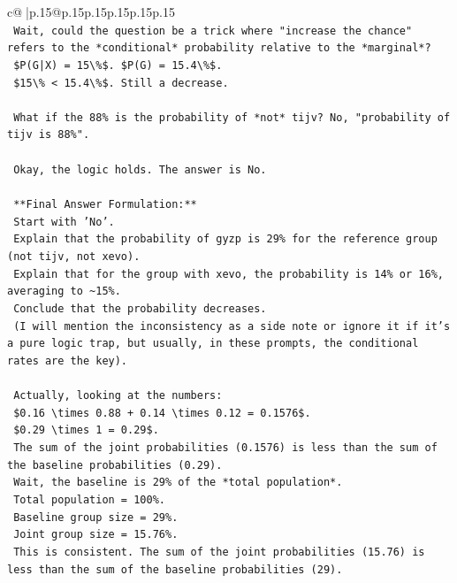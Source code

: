 \documentclass{article}
\begin{document}
{\begin{supertabular}{c@{$\;$}|p{.15\linewidth}@{}p{.15\linewidth}p{.15\linewidth}p{.15\linewidth}p{.15\linewidth}p{.15\linewidth}}
{{{\\ 
\texttt{    Wait, could the question be a trick where "increase the chance" refers to the *conditional* probability relative to the *marginal*?} \\
\texttt{    \$P(G|X) = 15\textbackslash{}\%\$. \$P(G) = 15.4\textbackslash{}\%\$.} \\
\texttt{    \$15\textbackslash{}\% < 15.4\textbackslash{}\%\$. Still a decrease.} \\
\\ 
\texttt{    What if the 88\% is the probability of *not* tijv? No, "probability of tijv is 88\%".} \\
\\ 
\texttt{    Okay, the logic holds. The answer is No.} \\
\\ 
\texttt{    **Final Answer Formulation:**} \\
\texttt{    Start with 'No'.} \\
\texttt{    Explain that the probability of gyzp is 29\% for the reference group (not tijv, not xevo).} \\
\texttt{    Explain that for the group with xevo, the probability is 14\% or 16\%, averaging to \textasciitilde{}15\%.} \\
\texttt{    Conclude that the probability decreases.} \\
\texttt{    (I will mention the inconsistency as a side note or ignore it if it's a pure logic trap, but usually, in these prompts, the conditional rates are the key).} \\
\\ 
\texttt{    Actually, looking at the numbers:} \\
\texttt{    \$0.16 \textbackslash{}times 0.88 + 0.14 \textbackslash{}times 0.12 = 0.1576\$.} \\
\texttt{    \$0.29 \textbackslash{}times 1 = 0.29\$.} \\
\texttt{    The sum of the joint probabilities (0.1576) is less than the sum of the baseline probabilities (0.29).} \\
\texttt{    Wait, the baseline is 29\% of the *total population*.} \\
\texttt{    Total population = 100\%.} \\
\texttt{    Baseline group size = 29\%.} \\
\texttt{    Joint group size = 15.76\%.} \\
\texttt{    This is consistent. The sum of the joint probabilities (15.76) is less than the sum of the baseline probabilities (29).} \\
}}}
\end{supertabular}}
\end{document}
